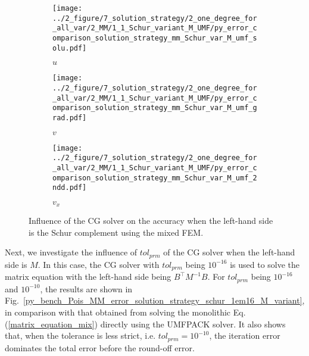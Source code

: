 \documentclass[review,3p]{elsarticle}
\begin{document}
\begin{figure}[!ht]
    \begin{subfigure}{5.5cm}
        \texttt{[image: ../2\_figure/7\_solution\_strategy/2\_one\_degree\_for\_all\_var/2\_MM/1\_1\_Schur\_variant\_M\_UMF/py\_error\_comparison\_solution\_strategy\_mm\_Schur\_var\_M\_umf\_solu.pdf]}
        \caption{$u$}
        \label{py_bench_Pois_MM_error_solution_strategy_schur_variant_other_UMF_solu}
    \end{subfigure}
    \hspace{-0.2cm}
    \begin{subfigure}{5.5cm}
        \texttt{[image: ../2\_figure/7\_solution\_strategy/2\_one\_degree\_for\_all\_var/2\_MM/1\_1\_Schur\_variant\_M\_UMF/py\_error\_comparison\_solution\_strategy\_mm\_Schur\_var\_M\_umf\_grad.pdf]}
        \caption{$v$}
        \label{py_bench_Pois_MM_error_solution_strategy_schur_variant_other_UMF_grad}
    \end{subfigure}
    \hspace{-0.2cm}
    \begin{subfigure}{5.5cm}
        \texttt{[image: ../2\_figure/7\_solution\_strategy/2\_one\_degree\_for\_all\_var/2\_MM/1\_1\_Schur\_variant\_M\_UMF/py\_error\_comparison\_solution\_strategy\_mm\_Schur\_var\_M\_umf\_2ndd.pdf]}
        \caption{$v_x$}
        \label{py_bench_Pois_MM_error_solution_strategy_schur_variant_other_UMF_2ndd}
    \end{subfigure}
\caption{Influence of the CG solver on the accuracy when the left-hand side is the Schur complement using the mixed FEM.}
\label{py_bench_Pois_MM_error_solution_strategy_schur_variant_other_UMF}
\end{figure}

Next, we investigate the influence of $tol_{prm}$ of the CG solver when the left-hand side is $M$. In this case, the CG solver with $tol_{prm}$ being $10^{-16}$ is used to solve the matrix equation with the left-hand side being $B^{\top}M^{-1}B$. For $tol_{prm}$ being $10^{-16}$ and $10^{-10}$, the results are shown in Fig.~\ref{py_bench_Pois_MM_error_solution_strategy_schur_1em16_M_variant}, in comparison with that obtained from solving the monolithic Eq. (\ref{matrix_equation_mix}) directly using the UMFPACK solver.
It also shows that, when the tolerance is less strict, i.e. $tol_{prm}=10^{-10}$, the iteration error dominates the total error before the round-off error.
\end{document}
